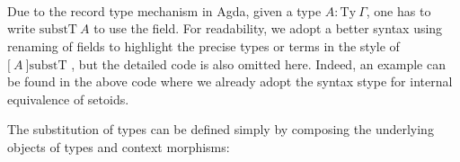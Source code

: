 \begin{code}
%
\\
\>  \AgdaSymbol{\{} \AgdaSymbol{:} \AgdaSymbol{\}(} \AgdaSymbol{:}  \AgdaSymbol{)} \AgdaSymbol{:}  \<%
\\
\>[0]\<[2]%
\>[2] \<%
\\
\>[0]\<[2]%
\>[2]\<%
\\
\>[2]\<[4]%
\>[4] \<[10]%
\>[10]\AgdaSymbol{:} \AgdaSymbol{(} \AgdaSymbol{:}   \AgdaSymbol{)}   \AgdaFunction{[}  \AgdaFunction{]fm}  \<%
\\
\>[2]\<[4]%
\>[4] \AgdaSymbol{:}  \AgdaSymbol{\{}  \AgdaSymbol{:}   \AgdaSymbol{\}}  \<[30]%
\>[30]\<%
\\
\>[4]\<[10]%
\>[10]\AgdaSymbol{(} \AgdaSymbol{:} \AgdaFunction{[}  \AgdaFunction{]}   \AgdaSymbol{)}  \<[30]%
\>[30]\<%
\\
\>[4]\<[10]%
\>[10]\AgdaFunction{[} \AgdaFunction{[}  \AgdaFunction{]fm}  \AgdaFunction{]} \AgdaFunction{[}  \AgdaFunction{]subst}  \AgdaSymbol{(} \AgdaSymbol{)}   \<%
\\
\end{code}


Due to the record type mechanism in Agda, given a type $A : \text{Ty} ~\Gamma$, one has to write $\text{substT} ~A$ to use the field. For readability, we adopt a better syntax using renaming of fields to highlight the precise types or terms in the style of $\text{[} ~A ~\text{]substT}$ , but the detailed code is also omitted here. Indeed, an example can be found in the above code where we already adopt the syntax stype for internal equivalence of setoids.


The substitution of types can be defined simply by composing the underlying objects of types and context morphisms:

